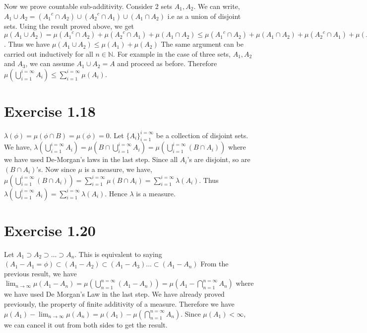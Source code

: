 \documentclass{article}
\begin{document}
    Now we prove countable sub-additivity. Consider 2 sets $A_1, A_2$. We can write, $A_1 \cup A_2 = ({A_1}^c \cap A_2) \cup ({A_2}^c \cap A_1) \cup (A_1 \cap A_2)$
    i.e as a union of disjoint sets. Using the result proved above, we get $\mu(A_1 \cup A_2) = \mu({A_1}^c \cap A_2) + \mu({A_2}^c \cap A_1) + \mu(A_1 \cap A_2)
    \le \mu({A_1}^c \cap A_2) + \mu(A_1 \cap A_2) + \mu({A_2}^c \cap A_1) + \mu(A_1 \cap A_2) = \mu(A_1) + \mu(A_2)$. Thus we have $\mu (A_1 \cup A_2) \le \mu(A_1) + \mu(A_2)$
    The same argument can be carried out inductively for all $n \in \mathbb{N}$. For example in the case of three sets, $A_1, A_2$ and $A_3$, we can assume $A_1 \cup A_2 = A$
    and proceed as before. Therefore $\mu(\bigcup_{i=1}^{i=\infty}A_i) \le \sum_{i=1}^{i=\infty}\mu(A_i)$.

  \section*{Exercise 1.18}
    $\lambda(\phi) = \mu(\phi \cap B) = \mu(\phi) = 0$. Let $\{A_i\}_{i=1}^{i= \infty}$ be a collection of disjoint sets.
    We have, $\lambda(\bigcup_{i=1}^{i = \infty}A_i) = \mu(B \cap \bigcup_{i=1}^{i = \infty}A_i) = \mu(\bigcup_{i=1}^{i=\infty}(B \cap A_i))$ where we have used De-Morgan's laws in the last step.
    Since all $A_i$'s are disjoint, so are $(B\cap A_i)$'s. Now since $\mu$ is a measure, we have, $\mu(\bigcup_{i=1}^{i=\infty}(B \cap A_i))  = \sum_{i=1}^{i=\infty}\mu(B \cap A_i) =
    \sum_{i=1}^{i=\infty} \lambda(A_i)$. Thus $\lambda(\bigcup_{i=1}^{i = \infty}A_i) = \sum_{i=1}^{i=\infty} \lambda(A_i)$. Hence $\lambda$ is a measure.

  \section*{Exercise 1.20}
    Let $A_1 \supset A_2 \supset ... \supset A_n$. This is equivalent to saying $(A_1 - A_1= \phi) \subset (A_1 - A_2) \subset (A_1 - A_3)... \subset(A_1 - A_n)$
    From the previous result, we have $\lim_{n \rightarrow \infty}\mu(A_1 - A_n) = \mu(\bigcup_{n=1}^{n=\infty}(A_1 - A_n)) = \mu(A_1 - \bigcap_{n=1}^{n=\infty}A_n)$ where we have used De Morgan's Law
    in the last step. We have already proved previously, the property of finite additivity of a measure. Therefore we have
    $\mu(A_1) - \lim_{n \rightarrow \infty}\mu(A_n) = \mu(A_1) - \mu(\bigcap_{n=1}^{n=\infty}A_n)$. Since $\mu(A_1) < \infty$, we can cancel it out from both sides to get the result.
\end{document}
